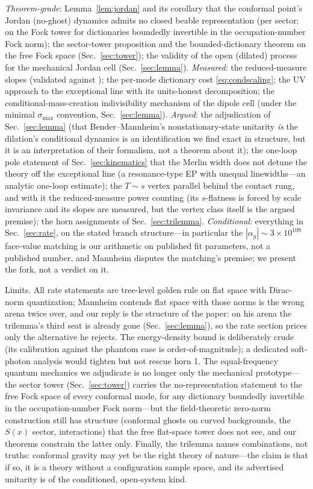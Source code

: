\documentclass[11pt]{article}
\theoremstyle{definition}
\theoremstyle{remark}
\newcommand{\ag}{\alpha_g}
\begin{document}
\emph{Theorem-grade}: Lemma~\ref{lem:jordan} and its corollary that
the conformal point's Jordan (no-ghost) dynamics admits no closed
beable representation (per
sector; on the Fock tower for dictionaries boundedly invertible in
the occupation-number Fock norm);
the sector-tower proposition and the bounded-dictionary theorem on
the free Fock space (Sec.~\ref{sec:tower}); the
validity of the open (dilated) process for the mechanical Jordan
cell (Sec.~\ref{sec:lemma}).
\emph{Measured}: the reduced-measure slopes (validated against
\cite{instantaneous}); the per-mode dictionary cost
\eqref{eq:condscaling};
the UV approach to the exceptional line with its units-honest
decomposition; the conditional-mass-creation indivisibility
mechanism of the dipole cell (under the minimal $\sigma_{\max}$
convention, Sec.~\ref{sec:lemma}).
\emph{Argued}: the adjudication of Sec.~\ref{sec:lemma} (that
Bender--Mannheim's nonstationary-state unitarity \emph{is} the
dilation's conditional dynamics is an identification we find exact
in structure, but it is an interpretation of their formalism, not a
theorem about it); the one-loop pole statement of
Sec.~\ref{sec:kinematics} that the Merlin width does not detune
the theory off the exceptional line (a resonance-type EP with
unequal linewidths---an analytic one-loop estimate); the $T\sim s$
vertex parallel behind the contact
rung, and with it the reduced-measure power counting (its
$s$-flatness is forced by scale invariance and its slopes are
measured, but the vertex class itself is the argued premise); the
horn assignments of Sec.~\ref{sec:trilemma}.
\emph{Conditional}: everything in Sec.~\ref{sec:rate}, on the stated
branch structure---in particular the $|\ag|\sim3\times10^{109}$
face-value matching is our arithmetic on published fit parameters,
not a published number, and Mannheim disputes the matching's
premise; we present the fork, not a verdict on it.

Limits. All rate statements are tree-level golden rule on flat
space with Dirac-norm quantization; Mannheim contends flat space
with those norms is the wrong arena twice over, and our reply is the
structure of the paper: on his arena the trilemma's third seat is
already gone (Sec.~\ref{sec:lemma}), so the rate section prices only
the alternative he rejects. The energy-density bound is
deliberately crude (its calibration against the phantom case is
order-of-magnitude); a dedicated soft-photon analysis would tighten
but not rescue horn 1. The equal-frequency quantum mechanics we
adjudicate is no longer only the mechanical prototype---the sector
tower (Sec.~\ref{sec:tower}) carries the no-representation
statement to the free Fock space of every conformal mode, for any
dictionary boundedly invertible in the occupation-number Fock
norm---but the field-theoretic zero-norm construction
still has structure (conformal ghosts on curved backgrounds, the
$S(x)$ sector, interactions) that the free flat-space tower does
not see, and our theorems constrain the latter only.
Finally, the trilemma names combinations, not truths: conformal
gravity may yet be the right theory of nature---the claim is that
if so, it is a theory without a configuration sample space, and its
advertised unitarity is of the conditioned, open-system kind.
\end{document}
